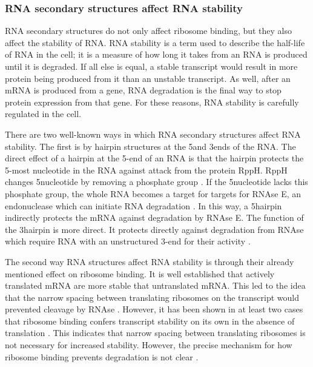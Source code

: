 \subsubsection{RNA secondary structures affect RNA stability}
RNA secondary structures do not only affect ribosome binding, but they also
affect the stability of RNA. RNA stability is a term used to describe the
half-life of RNA in the cell; it is a measure of how long it takes from an RNA
is produced until it is degraded. If all else is equal, a stable transcript
would result in more protein being produced from it than an unstable
transcript. As well, after an mRNA is produced from a gene, RNA degradation is
the final way to stop protein expression from that gene. For these reasons, RNA
stability is carefully regulated in the cell.

There are two well-known ways in which RNA secondary structures affect RNA
stability. The first is by hairpin structures at the 5\p and 3\p ends of the
RNA. The direct effect of a hairpin at the 5\p-end of an RNA is that the
hairpin protects the 5\p-most nucleotide in the RNA against attack from the
protein RppH. RppH changes 5\p nucleotide by removing a phosphate group
\cite{deana_bacterial_2008}. If the 5\p nucleotide lacks this phosphate group,
the whole RNA becomes a target for targets for RNAse E, an endonuclease which
can initiate RNA degradation \cite{mackie_ribonuclease_1998}. In this way, a
5\p hairpin indirectly protects the mRNA against degradation by RNAse E. The
function of the 3\p hairpin is more direct. It protects directly against
degradation from RNAse which require RNA with an unstructured 3\p-end for their
activity \cite{rauhut_mrna_1999}.

The second way RNA structures affect RNA stability is through their already
mentioned effect on ribosome binding. It is well established that actively
translated mRNA are more stable that untranslated mRNA. This led to the idea
that the narrow spacing between translating ribosomes on the transcript would
prevented cleavage by RNAse \cite{deana_lost_2005}. However, it has been shown
in at least two cases that ribosome binding confers transcript stability on its
own in the absence of translation \cite{wagner_efficient_1994,
hambraeus_5_2002}. This indicates that narrow spacing between translating
ribosomes is not necessary for increased stability.  However, the precise
mechanism for how ribosome binding prevents degradation is not clear
\cite{deana_lost_2005}.

